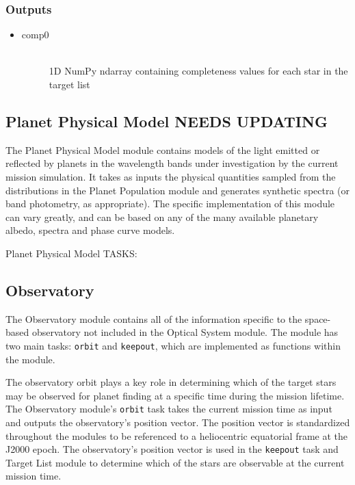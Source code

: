 \documentclass[cleanfoot]{asme2ej}
\begin{document}
\subsubsection*{Outputs}
\begin{itemize}
    \item 
    \begin{description}
        \item[comp0] \hfill \\
        1D NumPy ndarray containing completeness values for each star in the target list
    \end{description}
\end{itemize}


\subsection{Planet Physical Model NEEDS UPDATING} \label{sec:planetphysicalmodel}
The Planet Physical Model module contains models of the light emitted or reflected by planets in the wavelength bands under investigation by the current mission simulation.  It takes as inputs the physical quantities sampled from the distributions in the Planet Population module and generates synthetic spectra (or band photometry, as appropriate).  The specific implementation of this module can vary greatly, and can be based on any of the many available planetary albedo, spectra and phase curve models.

 Planet Physical Model TASKS:


\subsection{Observatory}
The Observatory module contains all of the information specific to the space-based observatory not included in the Optical System module. The module has two main tasks: \verb+orbit+ and \verb+keepout+, which are implemented as functions within the module. 

The observatory orbit plays a key role in determining which of the target stars may be observed for planet finding at a specific time during the mission lifetime. The Observatory module's \verb+orbit+ task takes the current mission time as input and outputs the observatory's position vector. The position vector is standardized throughout the modules to be referenced to a heliocentric equatorial frame at the J2000 epoch. The observatory's position vector is used in the \verb+keepout+ task and Target List module to determine which of the stars are observable at the current mission time.
\end{document}
